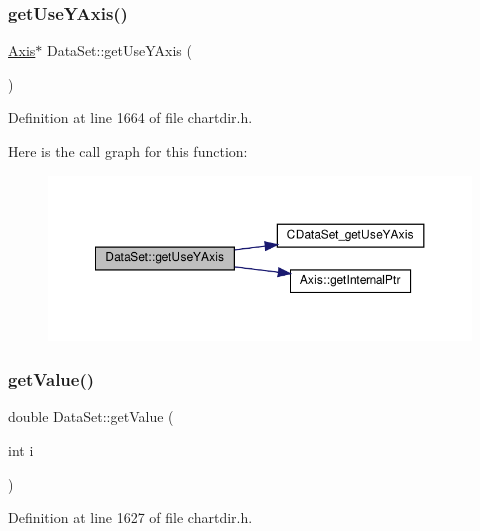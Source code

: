 \subsubsection{\texorpdfstring{get\+Use\+Y\+Axis()}{getUseYAxis()}}
{\footnotesize\ttfamily \hyperlink{class_axis}{Axis}$\ast$ Data\+Set\+::get\+Use\+Y\+Axis (\begin{DoxyParamCaption}{ }\end{DoxyParamCaption})\hspace{0.3cm}{\ttfamily [inline]}}



Definition at line 1664 of file chartdir.\+h.

Here is the call graph for this function\+:
\nopagebreak
\begin{figure}[H]
\begin{center}
\leavevmode
\includegraphics[width=350pt]{class_data_set_aa57e5e6fe299e68f398ef304944bbf47_cgraph}
\end{center}
\end{figure}
\mbox{\label{class_data_set_aa6fb7ec40666c6773515831ebcb6235e}} 
\subsubsection{\texorpdfstring{get\+Value()}{getValue()}}
{\footnotesize\ttfamily double Data\+Set\+::get\+Value (\begin{DoxyParamCaption}\item[{int}]{i }\end{DoxyParamCaption})\hspace{0.3cm}{\ttfamily [inline]}}



Definition at line 1627 of file chartdir.\+h.

